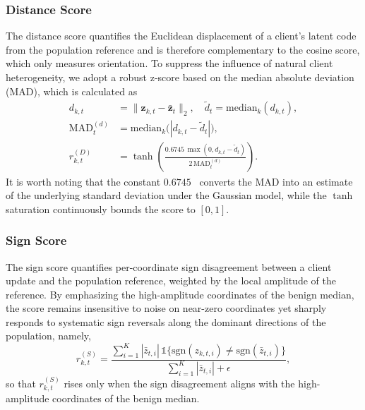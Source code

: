 \documentclass[journal]{IEEEtran}
\begin{document}
\subsubsection{Distance Score}
The distance score quantifies the Euclidean displacement of a client's latent code from the population reference and is therefore complementary to the cosine score, which only measures orientation. To suppress the influence of natural client heterogeneity, we adopt a robust z-score based on the median absolute deviation (MAD), which is calculated as
\begin{align}
d_{k,t} &= \|\mathbf{z}_{k,t} - \bar{\mathbf{z}}_t\|_2, \quad \tilde{d}_t = \mathrm{median}_k(d_{k,t}), \label{eq:dist_raw}\\
\mathrm{MAD}_t^{(d)} &= \mathrm{median}_k\bigl(|d_{k,t} - \tilde{d}_t|\bigr), \label{eq:dist_mad}\\
r_{k,t}^{(D)} &= \tanh\!\left(\frac{0.6745 \, \max(0, d_{k,t}-\tilde{d}_t)}{2\,\mathrm{MAD}_t^{(d)}}\right). \label{eq:dist_score}
\end{align}
It is worth noting that the constant $0.6745$~\cite{nist_modified_zscore} converts the MAD into an estimate of the underlying standard deviation under the Gaussian model, while the $\tanh$ saturation continuously bounds the score to $[0,1]$.

\subsubsection{Sign Score}
The sign score quantifies per-coordinate sign disagreement between a client update and the population reference, weighted by the local amplitude of the reference. By emphasizing the high-amplitude coordinates of the benign median, the score remains insensitive to noise on near-zero coordinates yet sharply responds to systematic sign reversals along the dominant directions of the population, namely,
\begin{equation}
r_{k,t}^{(S)} = \frac{\sum_{i=1}^{K} |\bar z_{t,i}|\,\mathbb{1}\{\mathrm{sgn}(z_{k,t,i}) \neq \mathrm{sgn}(\bar z_{t,i})\}}{\sum_{i=1}^{K} |\bar z_{t,i}| + \epsilon},
\label{eq:sign_score}
\end{equation}
so that $r_{k,t}^{(S)}$ rises only when the sign disagreement aligns with the high-amplitude coordinates of the benign median.
\end{document}
